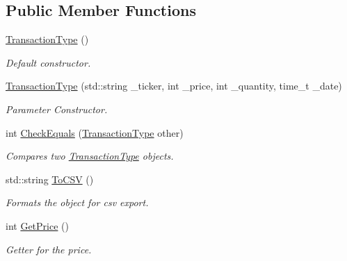 \subsection*{Public Member Functions}
\begin{DoxyCompactItemize}
\item 
\mbox{\label{class_transaction_type_af74ebcedbda4d46f90de333b9268b8a8}} 
\mbox{\hyperlink{class_transaction_type_af74ebcedbda4d46f90de333b9268b8a8}{Transaction\+Type}} ()
\begin{DoxyCompactList}\small\item\em Default constructor. \end{DoxyCompactList}\item 
\mbox{\label{class_transaction_type_ad608be1260aa2008d19f25f35e048207}} 
\mbox{\hyperlink{class_transaction_type_ad608be1260aa2008d19f25f35e048207}{Transaction\+Type}} (std\+::string \+\_\+ticker, int \+\_\+price, int \+\_\+quantity, time\+\_\+t \+\_\+date)
\begin{DoxyCompactList}\small\item\em Parameter Constructor. \end{DoxyCompactList}\item 
\mbox{\label{class_transaction_type_a0600069544b2650a1cbd3b4f99d80c8a}} 
int \mbox{\hyperlink{class_transaction_type_a0600069544b2650a1cbd3b4f99d80c8a}{Check\+Equals}} (\mbox{\hyperlink{class_transaction_type}{Transaction\+Type}} other)
\begin{DoxyCompactList}\small\item\em Compares two \mbox{\hyperlink{class_transaction_type}{Transaction\+Type}} objects. \end{DoxyCompactList}\item 
std\+::string \mbox{\hyperlink{class_transaction_type_ae93afca932014b0dfa4d1a3a66ca0ad2}{To\+C\+SV}} ()
\begin{DoxyCompactList}\small\item\em Formats the object for csv export. \end{DoxyCompactList}\item 
\mbox{\label{class_transaction_type_ac139f76c5ae460bd9c1c87570c6bee34}} 
int \mbox{\hyperlink{class_transaction_type_ac139f76c5ae460bd9c1c87570c6bee34}{Get\+Price}} ()
\begin{DoxyCompactList}\small\item\em Getter for the price. \end{DoxyCompactList}\item 

\end{DoxyCompactItemize}
